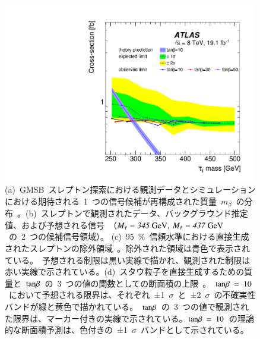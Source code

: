 \begin{figure}[H]
\begin{minipage}{0.49\hsize}
    \subcaption{}
    \end{minipage}
    \begin{minipage}{0.49\hsize}
    \centering   
    \includegraphics[width=0.99\textwidth]{img/stau/fig_07a.pdf}
    \end{minipage}
    \caption[(a)~GMSB~スレプトン探索における観測データとシミュレーションにおける期待される~1~つの信号候補が再構成された質量~$m_{\beta}$~の分布。(b)~スレプトンで観測されたデータ、バックグラウンド推定値、および予想される信号。(c)~95~$\%$~信頼水準における直接生成されたスレプトンの除外領域。(d)~スタウ粒子を直接生成するための質量と~$\rm{tan}\beta$~の~3~つの値の関数としての断面積の上限。]{(a)~GMSB~スレプトン探索における観測データとシミュレーションにおける期待される~1~つの信号候補が再構成された質量~$m_{\beta}$~の分布~\cite{AR:03}。(b)~スレプトンで観測されたデータ、バックグラウンド推定値、および予想される信号~\cite{AR:03}（$\it{M}_{\tilde{\tau}}=345~\rm{GeV},~\it{M}_{\tilde{\tau}}=437~\rm{GeV}$~の~2~つの候補信号領域）。
    (c)~95~$\%$~信頼水準における直接生成されたスレプトンの除外領域~\cite{AR:03}。除外された領域は青色で表示されている。~予想される制限は黒い実線で描かれ、観測された制限は赤い実線で示されている。(d)~スタウ粒子を直接生成するための質量と~$\rm{tan}\beta$~の~3~つの値の関数としての断面積の上限~\cite{AR:03}。~$\rm{tan}\beta~=~10$~において予想される限界は、それぞれ~±1~$\sigma$~と~±2~$\sigma$~の不確実性バンドが緑と黄色で描かれている。~$\rm{tan}\beta$~の~3~つの値で観測された限界は、マーカー付きの実線で示されている。$\rm{tan}\beta~=~10$~の理論的な断面積予測は、色付きの~±1~$\sigma$~バンドとして示されている。}\label{fig:stau1}
\end{figure}


